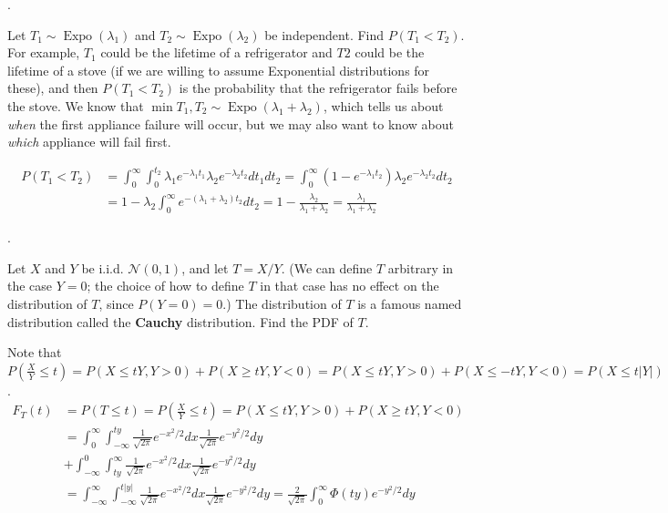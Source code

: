 \documentclass[8pt]{beamer}
\newcommand{\tb}[1]{\textbf{#1}}
\newcommand{\ti}[1]{\textit{#1}}
\newcommand{\Expo}[1]{\operatorname{Expo}\!\left(#1\right)}
\newcommand{\abs}[1]{\left\lvert #1 \right\rvert}
\begin{document}
\begin{frame}{.}
    \begin{example}
        Let $T_1 \sim \Expo{\lambda_1}$ and $T_2 \sim \Expo{\lambda_2}$ be independent. 
        Find $P(T_1 < T_2)$. For example, $T_1$ could be the lifetime of a refrigerator and $T2$ could be the lifetime of a stove (if we are willing to assume Exponential distributions for these), and then $P(T_1<T_2)$ is the probability that the refrigerator fails before the stove. 
        We know that $\min{T_1, T_2} \sim \Expo{\lambda_1 + \lambda_2}$, which tells us about \ti{when} the first appliance failure will occur, but we may also want to know about \ti{which} appliance will fail first.
    \end{example}
    \[
        \begin{aligned}
            P(T_1< T_2) &= \int_{0}^\infty \int_0^{t_2} \lambda_1e^{-\lambda_1 t_1} \lambda_2 e^{-\lambda_2 t_2} dt_1 dt_2 
            = \int_0^\infty (1 - e^{-\lambda_1 t_2}) \lambda_2 e^{-\lambda_2 t_2} dt_2 \\
            &= 1 - \lambda_2\int_0^\infty e^{-(\lambda_1 + \lambda_2)t_2} dt_2 = 1- \frac{\lambda_2}{\lambda_1 + \lambda_2} = \frac{\lambda_1}{\lambda_1 + \lambda_2}
        \end{aligned}
    \]
\end{frame}

\begin{frame}{.}
    \begin{example}
        Let $X$ and $Y$ be i.i.d. $\mathcal{N}(0,1)$, and let $T = X/Y$. (We can define $T$ arbitrary in the case $Y=0$; the choice of how to define $T$ in that case has no effect on the distribution of $T$, since $P(Y=0)=0$.) The distribution of $T$ is a famous named distribution called the \tb{Cauchy} distribution. Find the PDF of $T$.
    \end{example}
    Note that $P\left(\frac{X}{Y} \leq t\right) = P(X \leq tY, Y>0) + P(X \geq tY, Y<0) = P(X\leq tY, Y>0) + P(X \leq -tY, Y<0) = P(X\leq t\abs{Y})$.
    \[
    \begin{aligned}
        F_T(t) &= P(T\leq t) = P\left(\frac{X}{Y} \leq t\right) = P(X \leq tY, Y>0) + P(X \geq tY, Y<0) \\
        &= \int_0^\infty \int_{-\infty}^{ty} \frac{1}{\sqrt{2\pi}} e^{-x^2/2}  dx \frac{1}{\sqrt{2\pi}}e^{-y^2/2}dy \\
        &+ \int_{-\infty}^0 \int_{ty}^{\infty} \frac{1}{\sqrt{2\pi}}e^{-x^2/2} dx \frac{1}{\sqrt{2\pi}} e^{-y^2/2} dy \\ 
        &= \int_{-\infty}^\infty \int_{-\infty}^{t\abs{y}} \frac{1}{\sqrt{2\pi}}e^{-x^2/2} dx \frac{1}{\sqrt{2\pi}} e^{-y^2/2} dy = \frac{2}{\sqrt{2\pi}}\int_0^\infty \Phi(ty)  e^{-y^2/2} dy
    \end{aligned}
    \]
\end{frame}
\end{document}
